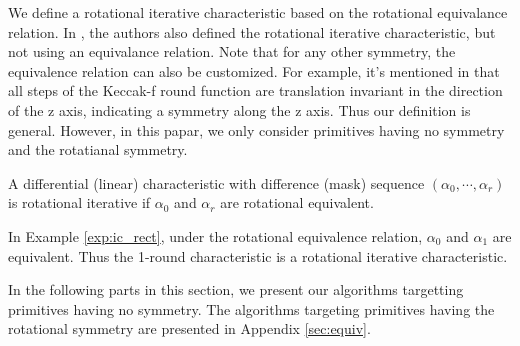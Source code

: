 We define a rotational iterative characteristic based on the rotational equivalance relation. In \cite{cui2019tangram}, the authors also defined the rotational iterative characteristic, but not using an equivalance relation. Note that for any other symmetry, the equivalence relation can also be customized. For example, it's mentioned in \cite{bertoni2013keccak} that all steps of the Keccak-f round function are translation invariant in the direction of the z axis, indicating a symmetry along the z axis. Thus our definition is general. However, in this papar, we only consider primitives having no symmetry and the rotatianal symmetry. 

\begin{definition}\label{def:rit}
    A differential (linear) characteristic with difference (mask) sequence $(\alpha_0,\cdots,\alpha_r)$ is rotational iterative if $\alpha_0$ and $\alpha_r$ are rotational equivalent.
\end{definition}

In Example \ref{exp:ic_rect}, under the rotational equivalence relation, $\alpha_0$ and $\alpha_1$ are equivalent. Thus the 1-round characteristic is a rotational iterative characteristic. 


In the following parts in this section, we present our algorithms targetting primitives having no symmetry. The algorithms targeting primitives having the rotational symmetry are presented in Appendix \ref{sec:equiv}. 







